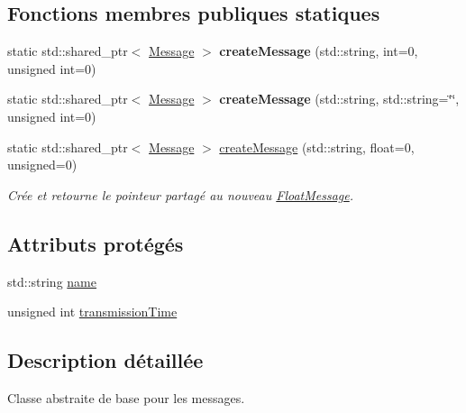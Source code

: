 \subsection*{Fonctions membres publiques statiques}
\begin{DoxyCompactItemize}
\item 
\hypertarget{classMessage_a18fddc1357914aa65d4a12eeabbf7bfa}{static std\-::shared\-\_\-ptr$<$ \hyperlink{classMessage}{Message} $>$ {\bfseries create\-Message} (std\-::string, int=0, unsigned int=0)}\label{classMessage_a18fddc1357914aa65d4a12eeabbf7bfa}

\item 
\hypertarget{classMessage_a9510bbfbcde96a857eb40b8222fe90a8}{static std\-::shared\-\_\-ptr$<$ \hyperlink{classMessage}{Message} $>$ {\bfseries create\-Message} (std\-::string, std\-::string=\char`\"{}\char`\"{}, unsigned int=0)}\label{classMessage_a9510bbfbcde96a857eb40b8222fe90a8}

\item 
\hypertarget{classMessage_a275c24aa740943af5872d874eeca0173}{static std\-::shared\-\_\-ptr$<$ \hyperlink{classMessage}{Message} $>$ \hyperlink{classMessage_a275c24aa740943af5872d874eeca0173}{create\-Message} (std\-::string, float=0, unsigned=0)}\label{classMessage_a275c24aa740943af5872d874eeca0173}

\begin{DoxyCompactList}\small\item\em Crée et retourne le pointeur partagé au nouveau \hyperlink{classFloatMessage}{Float\-Message}. \end{DoxyCompactList}\end{DoxyCompactItemize}
\subsection*{Attributs protégés}
\begin{DoxyCompactItemize}
\item 
std\-::string \hyperlink{classMessage_ac7adddb666acdc47c48f684bd6810a51}{name}
\item 
unsigned int \hyperlink{classMessage_a9f2d70860e0ec546c8e00cd69a3555ee}{transmission\-Time}
\end{DoxyCompactItemize}


\subsection{Description détaillée}
Classe abstraite de base pour les messages. 


